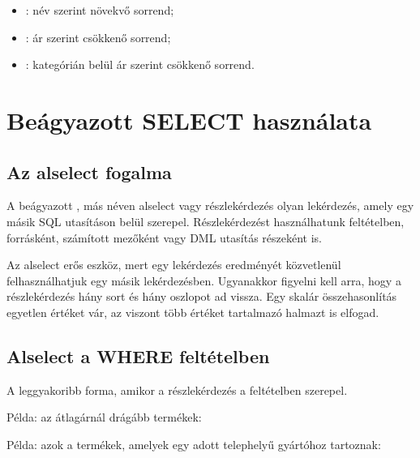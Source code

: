 \begin{itemize}
  \item {}: név szerint növekvő sorrend;
  \item {}: ár szerint csökkenő sorrend;
  \item {}: kategórián belül ár szerint csökkenő sorrend.
\end{itemize}

\section{Beágyazott SELECT használata}

\subsection{Az alselect fogalma}

A beágyazott , más néven alselect vagy részlekérdezés olyan lekérdezés, amely egy másik SQL utasításon belül szerepel. Részlekérdezést használhatunk feltételben, forrásként, számított mezőként vagy DML utasítás részeként is.

\begin{center}

\end{center}

Az alselect erős eszköz, mert egy lekérdezés eredményét közvetlenül felhasználhatjuk egy másik lekérdezésben. Ugyanakkor figyelni kell arra, hogy a részlekérdezés hány sort és hány oszlopot ad vissza. Egy skalár összehasonlítás egyetlen értéket vár, az  viszont több értéket tartalmazó halmazt is elfogad.

\subsection{Alselect a WHERE feltételben}

A leggyakoribb forma, amikor a részlekérdezés a  feltételben szerepel.

Példa: az átlagárnál drágább termékek:

\begin{center}
\end{center}

Példa: azok a termékek, amelyek egy adott telephelyű gyártóhoz tartoznak:

\begin{center}
\end{center}

